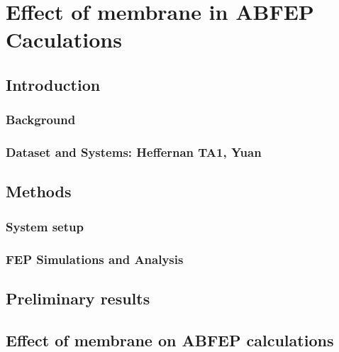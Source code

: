 \chapter{Effect of membrane in ABFEP Caculations}
\label{ch:abfes-on-agonists}
\section{Introduction}

\lipsum[1][1-3]

\subsection{Background}

\lipsum[1][1-3]

\subsection{Dataset and Systems: Heffernan TA1, Yuan}

\lipsum[1][1-3]

\section{Methods}

\lipsum[1][1-3]

\subsection{System setup}

\lipsum[1][1-3]

\subsection{FEP Simulations and Analysis}

\lipsum[1][1-3]

\section{Preliminary results}

\lipsum[1][1-3]

\section{Effect of membrane on ABFEP calculations}

\lipsum[1][1-3]

